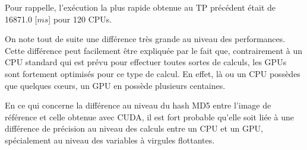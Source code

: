 \documentclass[12pt,a4paper,oneside, titlepage]{report}
\begin{document}
		Pour rappelle, l'exécution la plus rapide obtenue au TP précédent était de 16871.0 [$ms$] pour 120 CPUs.

		 On note tout de suite une différence très grande au niveau des performances. Cette différence peut facilement être expliquée par le fait que, contrairement à un CPU standard qui est prévu pour effectuer toutes sortes de calculs, les GPUs sont fortement optimisés pour ce type de calcul. En effet, là ou un CPU possèdes que quelques cœurs, un GPU en possède plusieurs centaines.

		 En ce qui concerne la différence au niveau du hash MD5 entre l'image de référence et celle obtenue avec CUDA, il est fort probable qu'elle soit liée à une différence de précision au niveau des calculs entre un CPU et un GPU, spécialement au niveau des variables à virgules flottantes.
\end{document}
